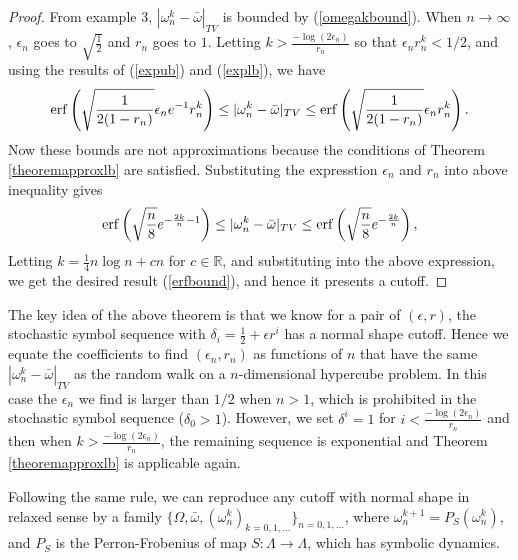 \begin{proof} From example 3, $|\omega^k_n - \bar{\omega}|_{TV}$ is bounded by (\ref{omegakbound}). When $n \to \infty$, $\epsilon_n$ goes to $\sqrt{\frac{1}{2}}$ and $r_n$ goes to $1$. Letting $k> \frac{-\log(2\epsilon_n)}{r_n}$ so that $\epsilon_n r_n^k<1/2$, and using the results of (\ref{expub}) and (\ref{explb}), we have
\begin{eqnarray}
                \operatorname{erf}\left( \sqrt{\frac{1}{2(1-r_n)}} \epsilon_n e^{-1} r_n^k \right)
            \le |\omega^k_n - \bar{\omega}|_{TV}
            \le \operatorname{erf}\left( \sqrt{\frac{1}{2(1-r_n)}} \epsilon_nr_n^k \right).
\end{eqnarray}
Now these bounds are not approximations because the conditions of Theorem \ref{theoremapproxlb} are satisfied. 
Substituting the expresstion $\epsilon_n$ and $r_n$ into above inequality gives
\begin{eqnarray}
                \operatorname{erf}\left(\sqrt{\frac{n}{8}}e^{-\frac{2k}{n}-1}  \right)
            \le |\omega^k_n - \bar{\omega}|_{TV}
            \le  \operatorname{erf}\left(\sqrt{\frac{n}{8}}e^{-\frac{2k}{n}}  \right),
\end{eqnarray}
Letting $k = \frac{1}{4}n\log{n}+cn $ for $c\in \mathbb{R}$, and substituting into the above expression, we get the desired result (\ref{erfbound}), and hence it presents a cutoff.
\end{proof}


The key idea of the above theorem is that we know for a pair of $(\epsilon,r)$, the stochastic symbol sequence with $\delta_i = \frac{1}{2}+\epsilon r^i$ has a normal shape cutoff. Hence we equate the coefficients to find $(\epsilon_n,r_n)$ as functions of $n$ that have the same $|\omega^k_n - \bar{\omega} |_{TV}$ as the random walk on a $n$-dimensional hypercube problem. In this case the $\epsilon_n$ we find is larger than $1/2$ when $n>1$, which is prohibited in the stochastic symbol sequence ($\delta_0>1$). However, we set $\delta^i=1$ for $i<\frac{-\log(2\epsilon_n)}{r_n}$ and then when $k> \frac{-\log(2\epsilon_n)}{r_n}$, the remaining sequence is exponential and Theorem \ref{theoremapproxlb} is applicable again.

Following the same rule, we can reproduce any cutoff with normal shape in relaxed sense by a family $\{\Omega,\bar{\omega},(\omega_n^k)_{k=0,1,\ldots}\}_{n=0,1,\ldots}$, where $\omega_n^{k+1} = P_S(\omega_n^k)$, and $P_S$ is the Perron-Frobenius of map $S:\Lambda \to \Lambda$, which has symbolic dynamics.


